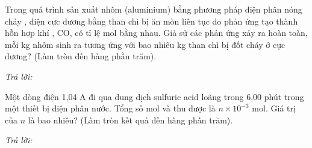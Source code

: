 \documentclass[11pt,a4paper]{article}
\def\loigiai#1{}
\begin{document}
\begin{ex}
Trong quá trình sản xuất nhôm (aluminium) bằng phương pháp điện phân nóng chảy , điện cực dương bằng than chì bị ăn mòn liên tục do phản ứng tạo thành hỗn hợp khí , CO,  có tỉ lệ mol bằng nhau. Giả sử các phản ứng xảy ra hoàn toàn, mỗi kg nhôm sinh ra tương ứng với bao nhiêu kg than chì bị đốt cháy ở cực dương? (Làm tròn đến hàng phần trăm).
\par\noindent\textit{Trả lời:} \dotfill
\loigiai{}
\end{ex}

\begin{ex}
Một dòng điện 1,04 A đi qua dung dịch sulfuric acid loãng trong 6,00 phút trong một thiết bị điện phân nước. Tổng số mol  và  thu được là $n \times 10^{-3}\text{ mol}$. Giá trị của $n$ là bao nhiêu? (Làm tròn kết quả đến hàng phần trăm).
\par\noindent\textit{Trả lời:} \dotfill
\loigiai{}
\end{ex}


\end{document}
